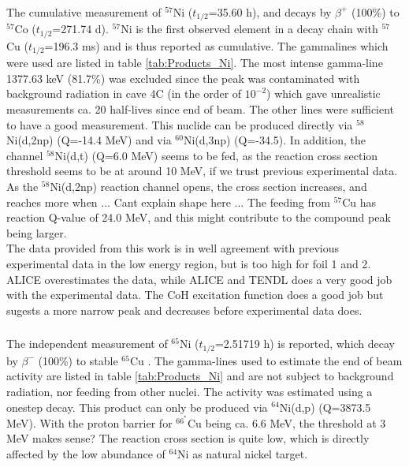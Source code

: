 \subsubsection{}
The cumulative measurement of $^{57}$Ni ($t_{1/2}$=35.60 h), and decays by $\beta^+$ (100\%) to $^{57}$Co ($t_{1/2}$=271.74 d). $^{57}$Ni is the first observed element in a decay chain with $^{57}$Cu ($t_{1/2}$=196.3 ms)\cite{Bhat1998} and is thus reported as cumulative. The gammalines which were used are listed in table \ref{tab:Products_Ni}. The most intense gamma-line 1377.63 keV (81.7\%) was excluded since the peak was contaminated with background radiation in cave 4C (in the order of $10^{-2}$) which gave unrealistic measurements ca. 20 half-lives since end of beam. The other lines were sufficient to have a good measurement. This nuclide can be produced directly via $^{58}$Ni(d,2np) (Q=-14.4 MeV) and via $^{60}$Ni(d,3np) (Q=-34.5). In addition, the channel $^{58}$Ni(d,t) (Q=6.0 MeV) seems to be fed, as the reaction cross section threshold seems to be at around 10 MeV, if we trust previous experimental data. As the $^{58}$Ni(d,2np) reaction channel opens, the cross section increases, and reaches more when ... Cant explain shape here ... The feeding from $^{57}$Cu has reaction Q-value of 24.0 MeV, and this might contribute to the compound peak being larger.  \\ 

\noindent 
The data provided from this work is in well agreement with previous experimental data in the low energy region, but is too high for foil 1 and 2\cite{Hermanne2013, Takacs2007, Avrigeanu2016, Takacs1997, Zweit1991}. ALICE overestimates the data, while ALICE and TENDL does a very good job with the experimental data. The CoH excitation function does a good job but sugests a more narrow peak and decreases before experimental data does. 


\subsubsection{}
The independent measurement of $^{65}$Ni ($t_{1/2}$=2.51719 h) is reported, which decay by $\beta^-$ (100\%) to stable $^{65}$Cu \cite{Browne2010a}. The gamma-lines used to estimate the end of beam activity are listed in table \ref{tab:Products_Ni} and are not subject to background radiation, nor feeding from other nuclei.  The activity was estimated using a onestep decay. This product can only be produced via $^{64}$Ni(d,p) (Q=3873.5 MeV). With the proton barrier for $^{66^*}$Cu being ca. 6.6 MeV, the threshold at 3 MeV makes sense? The reaction cross section is quite low, which is directly affected by the low abundance of $^{64}$Ni as natural nickel target. \\

